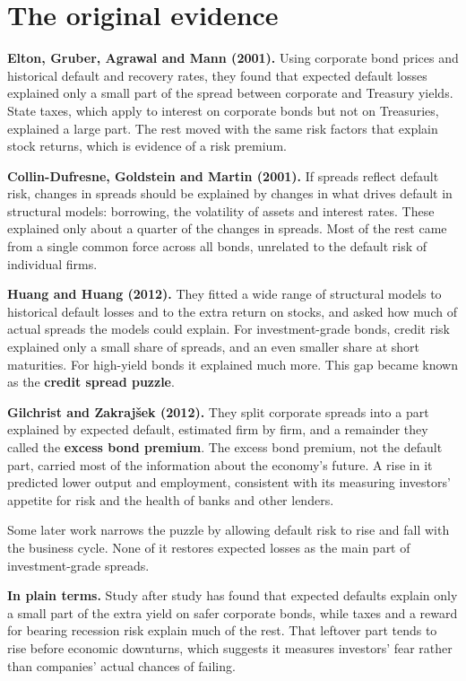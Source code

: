 \section{The original evidence}
\label{sec:15-evidence}

\textbf{Elton, Gruber, Agrawal and Mann (2001).} Using corporate bond prices and historical default and recovery rates, they found that expected default losses explained only a small part of the spread between corporate and Treasury yields. State taxes, which apply to interest on corporate bonds but not on Treasuries, explained a large part. The rest moved with the same risk factors that explain stock returns, which is evidence of a risk premium.

\textbf{Collin-Dufresne, Goldstein and Martin (2001).} If spreads reflect default risk, changes in spreads should be explained by changes in what drives default in structural models: borrowing, the volatility of assets and interest rates. These explained only about a quarter of the changes in spreads. Most of the rest came from a single common force across all bonds, unrelated to the default risk of individual firms.

\textbf{Huang and Huang (2012).} They fitted a wide range of structural models to historical default losses and to the extra return on stocks, and asked how much of actual spreads the models could explain. For investment-grade bonds, credit risk explained only a small share of spreads, and an even smaller share at short maturities. For high-yield bonds it explained much more. This gap became known as the \textbf{credit spread puzzle}.

\textbf{Gilchrist and Zakraj\v{s}ek (2012).} They split corporate spreads into a part explained by expected default, estimated firm by firm, and a remainder they called the \textbf{excess bond premium}. The excess bond premium, not the default part, carried most of the information about the economy's future. A rise in it predicted lower output and employment, consistent with its measuring investors' appetite for risk and the health of banks and other lenders.

Some later work narrows the puzzle by allowing default risk to rise and fall with the business cycle. None of it restores expected losses as the main part of investment-grade spreads.

\noindent\textbf{In plain terms.} Study after study has found that expected defaults explain only a small part of the extra yield on safer corporate bonds, while taxes and a reward for bearing recession risk explain much of the rest. That leftover part tends to rise before economic downturns, which suggests it measures investors' fear rather than companies' actual chances of failing.

